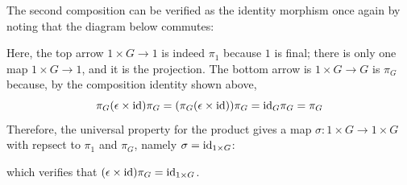 \documentclass[12pt]{article}
\begin{document}
The second composition can be verified as the identity morphism once again by noting that the diagram below commutes: 
\begin{center}
\end{center}
Here, the top arrow $1 \times G \rightarrow 1$ is indeed $\pi_{1}$ because $1$ is final; 
there is only one map $1 \times G \rightarrow 1$, and it is the projection. 
The bottom arrow is $1 \times G \rightarrow G$ is $\pi_{G}$ because, by the composition identity shown above, 
$$\pi_{G} (\epsilon \times \text{id}) \pi_{G} = (\pi_{G} (\epsilon \times \text{id})) \pi_{G} = \text{id}_{G} \pi_{G} = \pi_{G}$$ 
Therefore, the universal property for the product gives a map $\sigma: 1 \times G \rightarrow 1 \times G$ with repsect to $\pi_{1}$ and $\pi_{G}$, namely $\sigma = \text{id}_{1 \times G}$: 
\begin{center}
\end{center}
which verifies that $(\epsilon \times \text{id})\pi_{G} = \text{id}_{1 \times G}$. 
\end{document}
